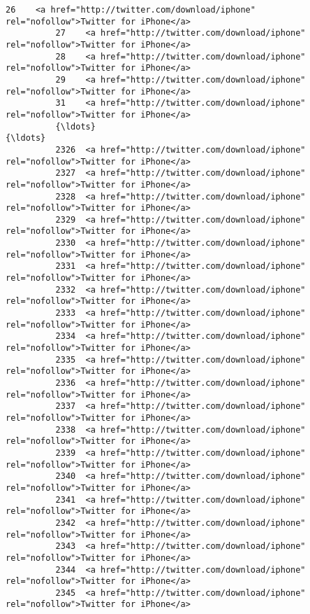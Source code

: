 \documentclass[11pt]{article}
\begin{document}
\begin{Verbatim}[commandchars=\\\{\}]
          26    <a href="http://twitter.com/download/iphone" rel="nofollow">Twitter for iPhone</a>   
          27    <a href="http://twitter.com/download/iphone" rel="nofollow">Twitter for iPhone</a>   
          28    <a href="http://twitter.com/download/iphone" rel="nofollow">Twitter for iPhone</a>   
          29    <a href="http://twitter.com/download/iphone" rel="nofollow">Twitter for iPhone</a>   
          31    <a href="http://twitter.com/download/iphone" rel="nofollow">Twitter for iPhone</a>   
          {\ldots}                                                                                  {\ldots}   
          2326  <a href="http://twitter.com/download/iphone" rel="nofollow">Twitter for iPhone</a>   
          2327  <a href="http://twitter.com/download/iphone" rel="nofollow">Twitter for iPhone</a>   
          2328  <a href="http://twitter.com/download/iphone" rel="nofollow">Twitter for iPhone</a>   
          2329  <a href="http://twitter.com/download/iphone" rel="nofollow">Twitter for iPhone</a>   
          2330  <a href="http://twitter.com/download/iphone" rel="nofollow">Twitter for iPhone</a>   
          2331  <a href="http://twitter.com/download/iphone" rel="nofollow">Twitter for iPhone</a>   
          2332  <a href="http://twitter.com/download/iphone" rel="nofollow">Twitter for iPhone</a>   
          2333  <a href="http://twitter.com/download/iphone" rel="nofollow">Twitter for iPhone</a>   
          2334  <a href="http://twitter.com/download/iphone" rel="nofollow">Twitter for iPhone</a>   
          2335  <a href="http://twitter.com/download/iphone" rel="nofollow">Twitter for iPhone</a>   
          2336  <a href="http://twitter.com/download/iphone" rel="nofollow">Twitter for iPhone</a>   
          2337  <a href="http://twitter.com/download/iphone" rel="nofollow">Twitter for iPhone</a>   
          2338  <a href="http://twitter.com/download/iphone" rel="nofollow">Twitter for iPhone</a>   
          2339  <a href="http://twitter.com/download/iphone" rel="nofollow">Twitter for iPhone</a>   
          2340  <a href="http://twitter.com/download/iphone" rel="nofollow">Twitter for iPhone</a>   
          2341  <a href="http://twitter.com/download/iphone" rel="nofollow">Twitter for iPhone</a>   
          2342  <a href="http://twitter.com/download/iphone" rel="nofollow">Twitter for iPhone</a>   
          2343  <a href="http://twitter.com/download/iphone" rel="nofollow">Twitter for iPhone</a>   
          2344  <a href="http://twitter.com/download/iphone" rel="nofollow">Twitter for iPhone</a>   
          2345  <a href="http://twitter.com/download/iphone" rel="nofollow">Twitter for iPhone</a>   

\end{Verbatim}
\end{document}
